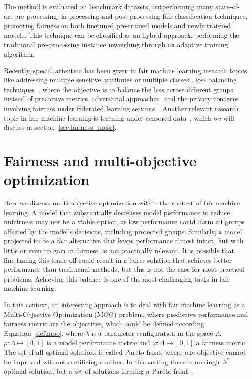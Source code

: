 The method is evaluated on benchmark datasets, outperforming many state-of-art pre-processing, in-processing and post-processing fair classification techniques, promoting fairness on both finetuned pre-trained models and newly traisned models. This technique can be classified as an hybrid approach, performing the traditional pre-processing instance reweighing through an adaptive training algorithm.

Recently, special attention has been given in fair machine learning research topics like addressing multiple sensitive attributes or multiple classes \cite{DAloisio2023,Liu_Wang_Wang_Wang_Su_Gao_2023}, loss balancing techniques~\cite{KIM2023231,KhaliliZA23}, where the objective is to balance the loss across different groups instead of predictive metrics, adversarial approaches~\cite{Liang2023,ZhangZLZY23,GrariLD23,MousaviMD23,Zeming2023,Yuchen2023} and the privacy concerns involving fairness under federated learning settings~\cite{ChenZZZY24,VucinichZ23}. Another relevant research topic in fair machine learning is learning under censored data~\cite{WZhang2022,WZhang2023_a,WZhang2023_b,WZhang2023_c}, which we will discuss in section~\ref{sec:fairness_noise}.


\section{Fairness and multi-objective optimization}

Here we discuss multi-objective optimization within the context of fair machine learning. A model that substantially decreases model performance to reduce unfairness may not be a viable option, as low performance could harm all groups affected by the model's decisions, including protected groups. Similarly, a model projected to be a fair alternative that keeps performance almost intact, but with little or even no gain in fairness, is not practically relevant. It is possible that fine-tuning this trade-off could result in a fairer solution that achieves better performance than traditional methods, but this is not the case for most practical problems. Achieving this balance is one of the most challenging tasks in fair machine learning.

In this context, an interesting approach is to deal with fair machine learning as a Multi-Objective Optimization (MOO) problem, where predictive performance and fairness metric are the objectives, which could be defined according Equation~\ref{def:moo}, where $\lambda$ is a parameter configuration in the space $\Lambda$, $\rho: \Lambda \mapsto [0,1]$ is a model performance metric and $\varphi: \Lambda \mapsto [0,1]$ a fairness metric. The set of all optimal solutions is called Pareto front, where one objective cannot be improved without sacrificing another. In this setting there is no single $\lambda^*$ optimal solution, but a set of solutions forming a Pareto front~\citep{pareto1906manuale}.

